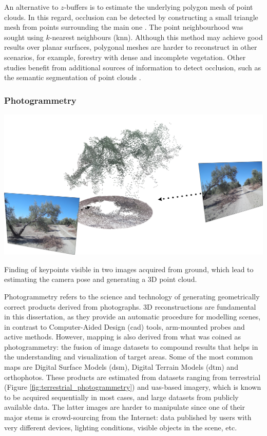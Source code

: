 An alternative to $z$-buffers is to estimate the underlying polygon mesh of point clouds. In this regard, occlusion can be detected by constructing a small triangle mesh from points surrounding the main one \cite{jurado_multispectral_2020}. The point neighbourhood was sought using $k$-nearest neighbours (\acrshort{knn}). Although this method may achieve good results over planar surfaces, polygonal meshes are harder to reconstruct in other scenarios, for example, forestry with dense and incomplete vegetation. Other studies benefit from additional sources of information to detect occlusion, such as the semantic segmentation of point clouds \cite{schneider_fusing_2010}. 

\subsubsection{Photogrammetry}

\begin{marginfigure}[2.0cm]
	\includegraphics{figs/fundamentals/terrestrial_photogrammetry.png}
	\caption{Finding of keypoints visible in two images acquired from ground, which lead to estimating the camera pose and generating a 3D point cloud.}
	\label{fig:terrestrial_photogrammetry}
\end{marginfigure}
Photogrammetry refers to the science and technology of generating geometrically correct products derived from photographs. 3D reconstructions are fundamental in this dissertation, as they provide an automatic procedure for modelling scenes, in contrast to Computer-Aided Design (\acrshort{cad}) tools, arm-mounted probes and active methods. However, mapping is also derived from what was coined as photogrammetry: the fusion of image datasets to compound results that helps in the understanding and visualization of target areas. Some of the most common maps are Digital Surface Models (\acrshort{dsm}), Digital Terrain Models (\acrshort{dtm}) and orthophotos. These products are estimated from datasets ranging from terrestrial (Figure \ref{fig:terrestrial_photogrammetry}) and \acrshort{uas}-based imagery, which is known to be acquired sequentially in most cases, and large datasets from publicly available data. The latter images are harder to manipulate since one of their major stems is crowd-sourcing from the Internet: data published by users with very different devices, lighting conditions, visible objects in the scene, etc.

